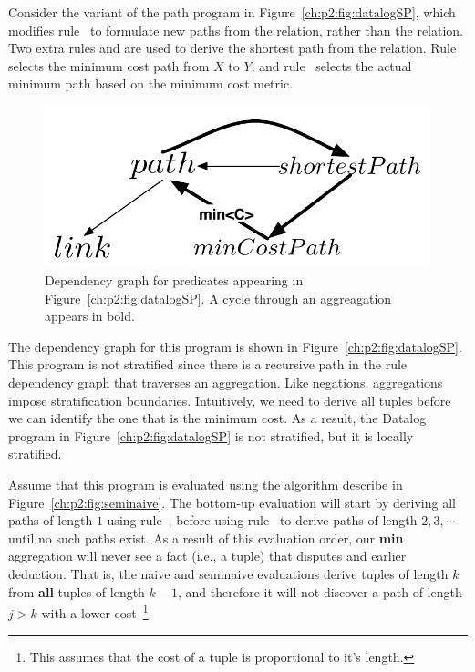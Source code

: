 Consider the variant of the path program in Figure~\ref{ch:p2:fig:datalogSP},
which modifies rule~ to formulate new paths from the  
relation, rather than the  relation.  Two extra rules  and  are used to
derive the shortest path from the  relation.  Rule~ selects the
minimum cost path from $X$ to $Y$, and rule~ selects the actual minimum
path based on the minimum cost metric.

\begin{figure} 
\ssp
\begin{center}
\includegraphics[scale=1]{figures/dependency-graph2}
\caption{\label{ch:p2:fig:dependency2}Dependency graph for predicates 
appearing in Figure~\ref{ch:p2:fig:datalogSP}. A cycle through an aggreagation
appears in bold. }
\end{center} 
\end{figure}

The dependency graph for this program is shown in
Figure~\ref{ch:p2:fig:datalogSP}.  This program is not stratified since there
is a recursive path in the rule dependency graph that traverses an aggregation.
Like negations, aggregations impose stratification boundaries.  Intuitively, we
need to derive all  tuples before we can identify the one that is the
minimum cost.  As a result, the Datalog program in
Figure~\ref{ch:p2:fig:datalogSP} is not stratified, but it is locally
stratified.

Assume that this program is evaluated using the algorithm describe in
Figure~\ref{ch:p2:fig:seminaive}.  The bottom-up evaluation will start by
deriving all paths of length $1$ using rule~, before using rule~
to derive paths of length $2, 3, \cdots$ until no such paths exist.  As a
result of this evaluation order, our {\bf min} aggregation will never see a
fact (i.e., a  tuple) that disputes and earlier deduction.  That is,
the naive and seminaive evaluations derive  tuples of length $k$ from
{\bf all}  tuples of length $k-1$, and therefore it will not discover a
path of length $j > k$ with a lower cost~\footnote{This assumes that the cost
of a  tuple is proportional to it's length.}.

